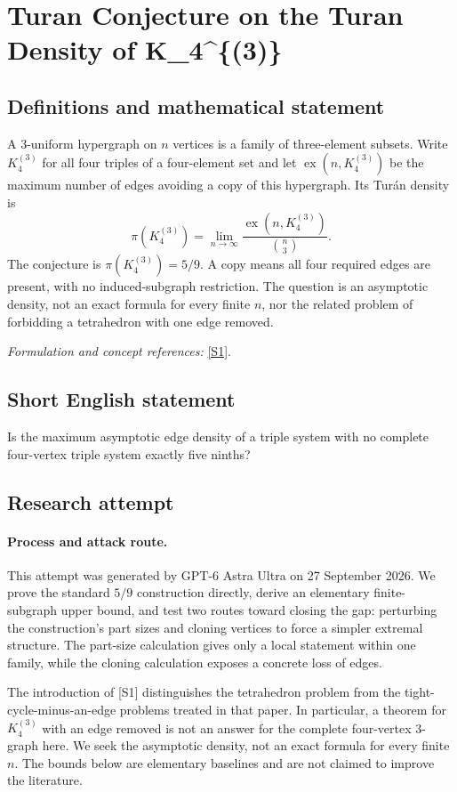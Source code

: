 \documentclass[11pt]{article}
\begin{document}
\section*{\texorpdfstring{Turan Conjecture on the Turan Density of K\_4\textasciicircum{}\{(3)\}}{Turan Conjecture on the Turan Density of K\_4\textasciicircum{}\{(3)\}}}\label{statement}
\subsection{Definitions and mathematical statement}
A $3$-uniform hypergraph on $n$ vertices is a family of three-element subsets. Write $K_4^{(3)}$ for all four triples of a four-element set and let $\operatorname{ex}(n,K_4^{(3)})$ be the maximum number of edges avoiding a copy of this hypergraph. Its Tur\'an density is
\[
 \pi(K_4^{(3)})=\lim_{n\to\infty}
 \frac{\operatorname{ex}(n,K_4^{(3)})}{\binom n3}.
\]
The conjecture is $\pi(K_4^{(3)})=5/9$. A copy means all four required edges are present, with no induced-subgraph restriction. The question is an asymptotic density, not an exact formula for every finite $n$, nor the related problem of forbidding a tetrahedron with one edge removed.
\par\smallskip\textit{Formulation and concept references:} \href{https://lidicky.name/pub/c5-.pdf}{[S1]}.

\subsection{Short English statement}
Is the maximum asymptotic edge density of a triple system with no complete four-vertex triple system exactly five ninths?
\subsection{Research attempt}
\paragraph{Process and attack route.}
This attempt was generated by GPT-6 Astra Ultra on 27 September 2026. We prove the standard $5/9$ construction directly, derive an elementary finite-subgraph upper bound, and test two routes toward closing the gap: perturbing the construction's part sizes and cloning vertices to force a simpler extremal structure. The part-size calculation gives only a local statement within one family, while the cloning calculation exposes a concrete loss of edges.

The introduction of [S1] distinguishes the tetrahedron problem from the tight-cycle-minus-an-edge problems treated in that paper. In particular, a theorem for $K_4^{(3)}$ with an edge removed is not an answer for the complete four-vertex 3-graph here. We seek the asymptotic density, not an exact formula for every finite $n$. The bounds below are elementary baselines and are not claimed to improve the literature.
\end{document}
